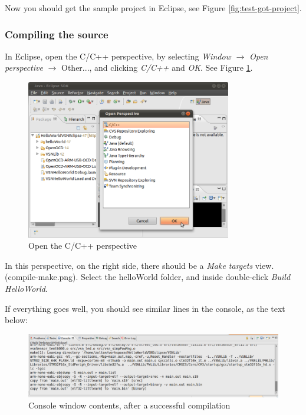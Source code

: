 \documentclass[a4paper, 10pt]{article}
\begin{document}
Now you should get the sample project in Eclipse, see 
Figure \ref{fig:test-got-project}.

\subsubsection{Compiling the source}

In Eclipse, open the C/C++ perspective,  by selecting \emph{Window} $\rightarrow$
\emph{Open perspective} $\rightarrow$ Other..., 
and clicking \emph{C/C++} and \emph{OK}.
See Figure \ref{fig:compile-c-perspective}.

    \begin{figure}[H]
    \centering
        \includegraphics[width=0.8\textwidth]{./png-install-guide/compile-c-perspective.png}
        \caption{Open the C/C++ perspective}
        \label{fig:compile-c-perspective}
    \end{figure}

In this perspective, 
on the right side, there should be a \emph{Make targets} view. (compile-make.png). 
Select the helloWorld folder, and inside double-click \emph{Build HelloWorld}.

If everything goes well, you should see similar lines in the console, as the text below:

    \begin{figure}[H]
    \centering
        \includegraphics[width=\textwidth]{./png-install-guide/compile-result.png}
        \caption{Console window contents, after a successful compilation}
        \label{fig:compile-result}
    \end{figure}
\end{document}
